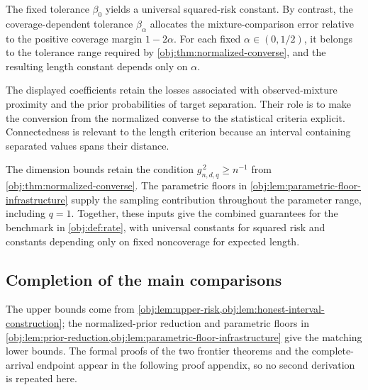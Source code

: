 The fixed tolerance \(\beta_0\) yields a universal squared-risk constant. By contrast, the coverage-dependent tolerance \(\beta_\alpha\) allocates the mixture-comparison error relative to the positive coverage margin \(1-2\alpha\). For each fixed \(\alpha\in(0,1/2)\), it belongs to the tolerance range required by \cref{obj:thm:normalized-converse}, and the resulting length constant depends only on \(\alpha\).

The displayed coefficients retain the losses associated with observed-mixture proximity and the prior probabilities of target separation. Their role is to make the conversion from the normalized converse to the statistical criteria explicit. Connectedness is relevant to the length criterion because an interval containing separated values spans their distance.

The dimension bounds retain the condition \(g_{n,d,q}^{\,2}\ge n^{-1}\) from \cref{obj:thm:normalized-converse}. The parametric floors in \cref{obj:lem:parametric-floor-infrastructure} supply the sampling contribution throughout the parameter range, including \(q=1\). Together, these inputs give the combined guarantees for the benchmark in \cref{obj:def:rate}, with universal constants for squared risk and constants depending only on fixed noncoverage for expected length.

\subsection{Completion of the main comparisons}

The upper bounds come from \cref{obj:lem:upper-risk,obj:lem:honest-interval-construction}; the normalized-prior reduction and parametric floors in \cref{obj:lem:prior-reduction,obj:lem:parametric-floor-infrastructure} give the matching lower bounds. The formal proofs of the two frontier theorems and the complete-arrival endpoint appear in the following proof appendix, so no second derivation is repeated here.
